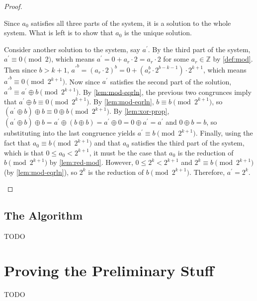 \documentclass[1gpt]{article}
\theoremstyle{break}
\newcommand{\xor}{\oplus}
\begin{document}
\begin{proof}
\begin{enumerate}
            Since $a_0$ satisfies all three parts of the system, it is a
            solution to the whole system. What is left is to show that $a_0$ is
            the unique solution. 

            Consider another solution to the system, say $a^\prime$. By the
            third part of the system, $a^\prime \equiv 0 \pmod{2}$, which means
            $a^\prime = 0 + a_r \cdot 2 = a_r \cdot 2$ for some $a_r \in
            \mathbb{Z}$ by \ref{def:mod}. Then since $b > k + 1$, ${a^\prime}^b
            = (a_r \cdot 2)^b = 0 + (a_r^b \cdot 2^{b-k-1}) \cdot 2^{k+1}$,
            which means ${a^\prime}^b \equiv 0 \pmod{2^{k+1}}$. Now since
            $a^\prime$ satisfies the second part of the solution, ${a^\prime}^b
            \equiv a^\prime \xor b \pmod{2^{k+1}}$. By \ref{lem:mod-eqrln}, the
            previous two congrunces imply that $a^\prime \xor b \equiv 0
            \pmod{2^{k+1}}$. By \ref{lem:mod-eqrln}, $b \equiv b
            \pmod{2^{k+1}}$, so $(a^\prime \xor b) \xor b \equiv 0 \xor b
            \pmod{2^{k+1}}$. By \ref{lem:xor-prop}, $(a^\prime \xor b) \xor b =
            a^\prime \xor (b \xor b) = a^\prime \xor 0 = 0 \xor a^\prime =
            a^\prime$ and $0 \xor b = b$, so substituting into the last
            congruence yields $a^\prime \equiv b \pmod{2^{k+1}}$. Finally,
            using the fact that $a_0 \equiv b \pmod{2^{k+1}}$ and that $a_0$
            satisfies the third part of the system, which is that $0 \leq a_0 <
            2^{k+1}$, it must be the case that $a_0$ is the reduction of $b
            \pmod{2^{k+1}}$ by \ref{lem:red-mod}. However, $0 \leq 2^k <
            2^{k+1}$ and $2^k \equiv b \pmod{2^{k+1}}$ (by
            \ref{lem:mod-eqrln}), so $2^k$ is the reduction of $b \pmod
            {2^{k+1}}$. Therefore, $a^\prime = 2^k$.

    \end{enumerate}

    \hfill\proofSymbol

\end{proof}

\subsection{The Algorithm}

TODO

\section{Proving the Preliminary Stuff}

TODO
\end{document}
